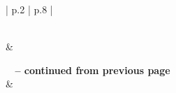 \begin{center}
\begin{longtable}{| p{} | p{} |}
\caption{ICCMA 2017 Submissions}
\label{table:ICCMA2017Submissions}\\

\hline {} & \\ \hline 
\endfirsthead


%
{{\bfseries \tablename\ \thetable{} -- continued from previous page}} \\
\hline {} &
 \\ \hline 
\endhead

\hline {} \\ \hline
\endfoot

\hline \hline
\endlastfoot


\end{longtable}
\end{center}
